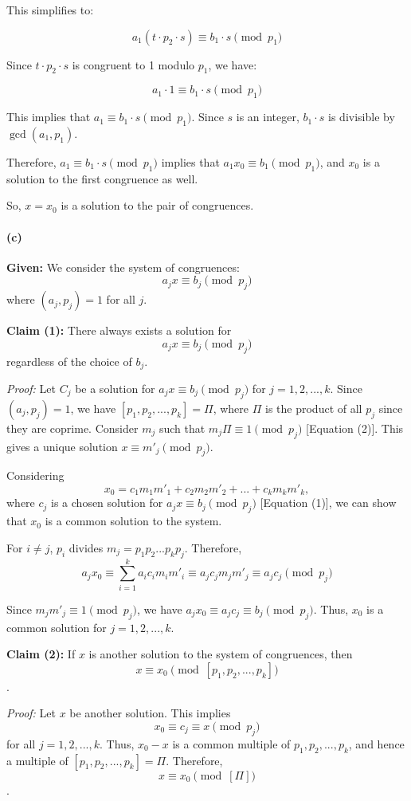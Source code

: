 \documentclass[12pt]{article}
\begin{document}
This simplifies to:

\[a_1(t \cdot p_2 \cdot s) \equiv b_1 \cdot s \pmod{p_1}\]

Since \(t \cdot p_2 \cdot s\) is congruent to 1 modulo \(p_1\), we have:

\[a_1 \cdot 1 \equiv b_1 \cdot s \pmod{p_1}\]

This implies that \(a_1 \equiv b_1 \cdot s \pmod{p_1}\). Since \(s\) is an integer, \(b_1 \cdot s\) is divisible by \(\gcd(a_1, p_1)\).

Therefore, \(a_1 \equiv b_1 \cdot s \pmod{p_1}\) implies that \(a_1x_0 \equiv b_1 \pmod{p_1}\), and \(x_0\) is a solution to the first congruence as well.

So, \(x = x_0\) is a solution to the pair of congruences.


\paragraph{(c)}

\textbf{Given:}
We consider the system of congruences:
\[
a_jx \equiv b_j \pmod{p_j}
\]
where $(a_j, p_j) = 1$ for all $j$.

\textbf{Claim (1):}
There always exists a solution for
\[
a_jx \equiv b_j \pmod{p_j}
\]
regardless of the choice of $b_j$.

\textit{Proof:}
Let $C_j$ be a solution for $a_jx \equiv b_j \pmod{p_j}$ for $j = 1,2,...,k$. Since $(a_j, p_j) = 1$, we have $[p_1, p_2, ..., p_k] = \Pi$, where $\Pi$ is the product of all $p_j$ since they are coprime. Consider $m_j$ such that $m_j\Pi \equiv 1 \pmod{p_j}$ [Equation (2)]. This gives a unique solution $x \equiv m'_j \pmod{p_j}$.

Considering
\[
x_0 = c_1m_1m'_1 + c_2m_2m'_2 + ... + c_km_km'_k,
\]
where $c_j$ is a chosen solution for $a_jx \equiv b_j \pmod{p_j}$ [Equation (1)], we can show that $x_0$ is a common solution to the system.

For $i \neq j$, $p_i$ divides $m_j = p_1p_2...p_kp_j$. Therefore,
\[
a_jx_0 \equiv \sum_{i=1}^{k} a_ic_im_im'_i \equiv a_jc_jm_jm'_j \equiv a_jc_j \pmod{p_j}
\]

Since $m_jm'_j \equiv 1 \pmod{p_j}$, we have $a_jx_0 \equiv a_jc_j \equiv b_j \pmod{p_j}$. Thus, $x_0$ is a common solution for $j = 1,2,...,k$.

\textbf{Claim (2):}
If $x$ is another solution to the system of congruences, then
\[
x \equiv x_0 \pmod{[p_1, p_2, ..., p_k]}
\].

\textit{Proof:}
Let $x$ be another solution. This implies
\[
x_0 \equiv c_j \equiv x \pmod{p_j}
\]
for all $j = 1,2,...,k$. Thus, $x_0 - x$ is a common multiple of $p_1, p_2, ..., p_k$, and hence a multiple of $[p_1, p_2, ..., p_k] = \Pi$. Therefore,
\[
x \equiv x_0 \pmod{[\Pi]}
\].
\end{document}
